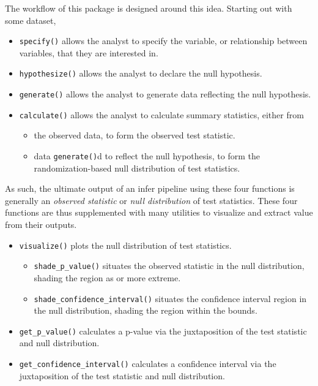 \documentclass[10pt,a4paper,onecolumn]{article}
\providecommand{\tightlist}{%
  \setlength{\itemsep}{0pt}\setlength{\parskip}{0pt}}
\begin{document}
The workflow of this package is designed around this idea. Starting out
with some dataset,

\begin{itemize}
\tightlist
\item
  \texttt{specify()} allows the analyst to specify the variable, or
  relationship between variables, that they are interested in.
\item
  \texttt{hypothesize()} allows the analyst to declare the null
  hypothesis.
\item
  \texttt{generate()} allows the analyst to generate data reflecting the
  null hypothesis.
\item
  \texttt{calculate()} allows the analyst to calculate summary
  statistics, either from

  \begin{itemize}
  \tightlist
  \item
    the observed data, to form the observed test statistic.
  \item
    data \texttt{generate()}d to reflect the null hypothesis, to form
    the randomization-based null distribution of test statistics.
  \end{itemize}
\end{itemize}

As such, the ultimate output of an infer pipeline using these four
functions is generally an \emph{observed statistic} or \emph{null
distribution} of test statistics. These four functions are thus
supplemented with many utilities to visualize and extract value from
their outputs.

\begin{itemize}
\tightlist
\item
  \texttt{visualize()} plots the null distribution of test statistics.

  \begin{itemize}
  \tightlist
  \item
    \texttt{shade\_p\_value()} situates the observed statistic in the
    null distribution, shading the region as or more extreme.
  \item
    \texttt{shade\_confidence\_interval()} situates the confidence
    interval region in the null distribution, shading the region within
    the bounds.
  \end{itemize}
\item
  \texttt{get\_p\_value()} calculates a p-value via the juxtaposition of
  the test statistic and null distribution.
\item
  \texttt{get\_confidence\_interval()} calculates a confidence interval
  via the juxtaposition of the test statistic and null distribution.
\end{itemize}
\end{document}
